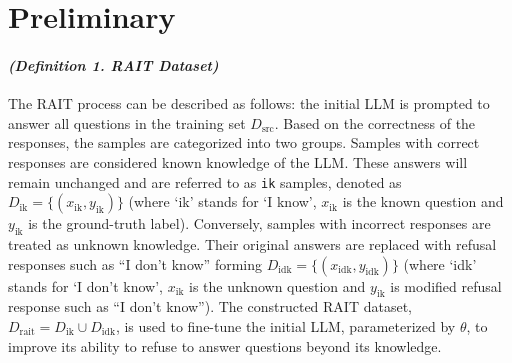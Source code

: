 \section{Preliminary}
\label{sec:Preliminary}
\paragraph{\textit{(Definition 1. RAIT Dataset)}} 
The RAIT process can be described as follows: the initial LLM is prompted to answer all questions in the training set $D_{\text{src}}$. Based on the correctness of the responses, the samples are categorized into two groups. 
\textit{\textbf{}} Samples with correct responses are considered known knowledge of the LLM. These answers will remain unchanged and are referred to as \texttt{ik} samples, denoted as $D_{\text{ik}} = \{(x_{\text{ik}}, y_{\text{ik}})\}$ (where `ik' stands for `I know', $x_{\text{ik}}$ is the known question and $y_{\text{ik}}$ is the ground-truth label). \textit{\textbf{}} Conversely, samples with incorrect responses are treated as unknown knowledge. Their original answers are replaced with refusal responses such as ``I don't know'' forming $D_{\text{idk}} = \{(x_{\text{idk}}, y_{\text{idk}})\}$ (where `idk' stands for `I don't know', $x_{\text{ik}}$ is the unknown question and $y_{\text{ik}}$ is modified refusal response such as ``I don't know''). 
The constructed RAIT dataset, $D_{\text{rait}} = D_{\text{ik}} \cup D_{\text{idk}}$, is used to fine-tune the initial LLM, parameterized by $\theta$, to improve its ability to refuse to answer questions beyond its knowledge.

